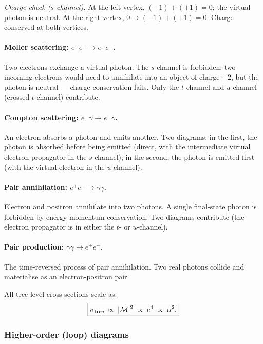 \documentclass[../main.tex]{subfiles}
\begin{document}
\textit{Charge check ($s$-channel):}  At the left vertex, $(-1)+(+1)=0$; the virtual photon is neutral.  At the right vertex, $0\to(-1)+(+1)=0$.  Charge conserved at both vertices. \checkmark

\paragraph{M\o{}ller scattering: $e^-e^-\to e^-e^-$.}
Two electrons exchange a virtual photon.  The $s$-channel is forbidden: two incoming electrons would need to annihilate into an object of charge $-2$, but the photon is neutral — charge conservation fails.  Only the $t$-channel and $u$-channel (crossed $t$-channel) contribute.

\paragraph{Compton scattering: $e^-\gamma\to e^-\gamma$.}
An electron absorbs a photon and emits another.  Two diagrams: in the first, the photon is absorbed before being emitted (direct, with the intermediate virtual electron propagator in the $s$-channel); in the second, the photon is emitted first (with the virtual electron in the $u$-channel).

\paragraph{Pair annihilation: $e^+e^-\to\gamma\gamma$.}
Electron and positron annihilate into two photons.  A single final-state photon is forbidden by energy-momentum conservation.  Two diagrams contribute (the electron propagator is in either the $t$- or $u$-channel).

\paragraph{Pair production: $\gamma\gamma\to e^+e^-$.}
The time-reversed process of pair annihilation.  Two real photons collide and materialise as an electron-positron pair.

All tree-level cross-sections scale as:
\begin{equation}
  \boxed{\sigma_{\rm tree} \;\propto\; |\mathcal{M}|^2 \;\propto\; e^4 \;\propto\; \alpha^2.}
  \label{eq:lec11:tree-xsec}
\end{equation}

\subsubsection*{Higher-order (loop) diagrams}
\end{document}

